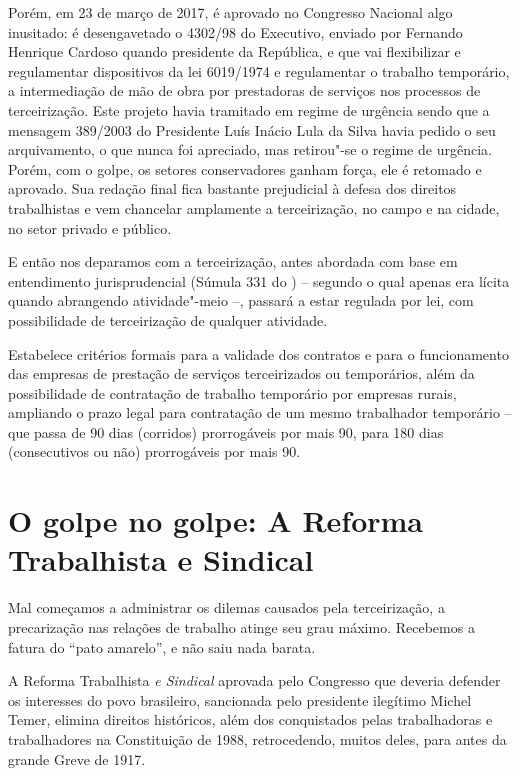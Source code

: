 Porém, em 23 de março de 2017, é aprovado no Congresso Nacional algo
inusitado: é desengavetado o  4302/98 do Executivo, enviado por
Fernando Henrique Cardoso quando presidente da República, e que vai
flexibilizar e regulamentar dispositivos da lei 6019/1974 e regulamentar
o trabalho temporário, a intermediação de mão de obra por prestadoras de
serviços nos processos de terceirização. Este projeto havia tramitado em
regime de urgência sendo que a mensagem 389/2003 do Presidente Luís
Inácio Lula da Silva havia pedido o seu arquivamento, o que nunca foi
apreciado, mas retirou"-se o regime de urgência. Porém, com o golpe, os
setores conservadores ganham força, ele é retomado e aprovado. Sua
redação final fica bastante prejudicial à defesa dos direitos
trabalhistas e vem chancelar amplamente a terceirização, no campo e na
cidade, no setor privado e público.

E então nos deparamos com a terceirização, antes abordada com base em
entendimento jurisprudencial (Súmula 331 do ) -- segundo o qual apenas
era lícita quando abrangendo atividade"-meio --, passará a estar regulada
por lei, com possibilidade de terceirização de qualquer atividade.

Estabelece critérios formais para a validade dos contratos e para o
funcionamento das empresas de prestação de serviços terceirizados ou
temporários, além da possibilidade de contratação de trabalho temporário por
empresas rurais, ampliando o prazo legal para contratação de um mesmo
trabalhador temporário -- que passa de 90 dias (corridos) prorrogáveis
por mais 90, para 180 dias (consecutivos ou não) prorrogáveis por mais
90.

\section{O golpe no golpe: A Reforma Trabalhista e Sindical}

Mal começamos a administrar os dilemas causados pela terceirização,
a precarização nas relações de trabalho atinge seu grau máximo. Recebemos
a fatura do ``pato amarelo'', e não saiu nada barata.

A Reforma Trabalhista \emph{e Sindical} aprovada pelo Congresso que
deveria defender os interesses do povo brasileiro, sancionada
pelo presidente ilegítimo Michel Temer, elimina direitos históricos,
além dos conquistados pelas trabalhadoras e trabalhadores na
Constituição de 1988, retrocedendo, muitos deles, para antes da grande
Greve de 1917.

